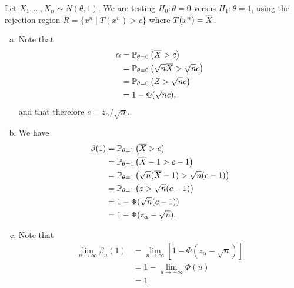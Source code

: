\begin{ex}
  Let $X_1,\ldots,X_n\sim N(\theta, 1)$. We are testing $H_0:\theta=0$ versus
  $H_1:\theta=1$, using the rejection region $R=\{x^n \mid T(x^n)>c\}$ where
  $T(x^n)=\overline{X}$.
  \begin{enumerate}[(a)]
    \item Note that
          \begin{align*}
            \alpha
             & = \mathbb{P}_{\theta=0}\left(\overline{X} > c \right)                 \\
             & = \mathbb{P}_{\theta=0}\left(\sqrt{n}\overline{X} > \sqrt{n}c \right) \\
             & = \mathbb{P}_{\theta=0}\left(Z > \sqrt{n}c \right)             \\
             & = 1-\Phi(\sqrt{n}c),
          \end{align*}
          and that therefore $c=z_{\alpha}/\sqrt{n}$.
    \item We have
          \begin{align*}
            \beta(1)
             & = \mathbb{P}_{\theta=1}\left(\overline{X} > c \right)                         \\
             & = \mathbb{P}_{\theta=1}\left(\overline{X}-1 > c-1 \right)                     \\
             & = \mathbb{P}_{\theta=1}\left(\sqrt{n}(\overline{X}-1) > \sqrt{n}(c-1) \right) \\
             & = \mathbb{P}_{\theta=1}\left(z > \sqrt{n}(c-1) \right)                 \\
             & = 1-\Phi(\sqrt{n}({c-1}))                                              \\
             & = 1-\Phi(z_\alpha-\sqrt{n}).
          \end{align*}
    \item Note that
          \begin{align*}
            \lim_{n\to\infty}\beta_n(1)
             & =\lim_{n\to\infty}[1-\Phi(z_\alpha-\sqrt{n})] \\
             & =1-\lim_{u\to-\infty}\Phi(u)                  \\
             & =1.
          \end{align*}
  \end{enumerate}
\end{ex}

